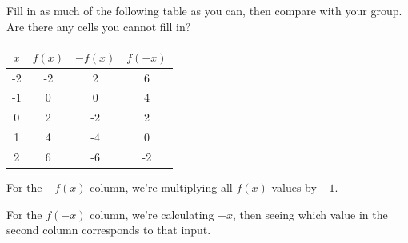 \documentclass[noauthor]{ximera}
\begin{document}
\begin{problem}
Fill in as much of the following table as you can, then 
compare with your group. Are there any cells you cannot fill in?

\begin{center}
\begin{tabular}{|c|c|c|c|} 
 \hline
 \(x\) & \(f(x)\) & \(-f(x)\) & \(f(-x)\) \\
 \hline\hline
 -2 & -2 & 2 & 6 \\ 
 \hline
 -1 & 0 & 0 & 4 \\
 \hline
 0 & 2 & -2 & 2 \\
 \hline
 1 & 4 & -4 & 0 \\
 \hline
 2 & 6 & -6 & -2 \\
 \hline
\end{tabular}
\end{center}

\begin{explanation}
    For the \(-f(x)\) column, we're multiplying all \(f(x)\) values by \(-1\).

For the \(f(-x)\) column, we're calculating \(-x\), then seeing which value in the second column corresponds to that input.
\end{explanation}

\end{problem}
\end{document}
